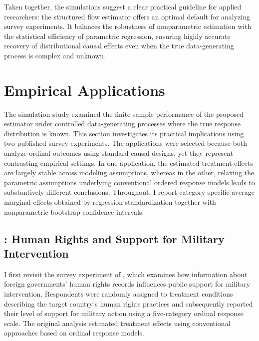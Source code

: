 \documentclass{article}
\begin{document}

Taken together, the simulations suggest a clear practical guideline for applied researchers: the structured flow estimator offers an optimal default for analyzing survey experiments. It balances the robustness of nonparametric estimation with the statistical efficiency of parametric regression, ensuring highly accurate recovery of distributional causal effects even when the true data-generating process is complex and unknown.

\section{Empirical Applications}
\label{sec:application}

The simulation study examined the finite-sample performance of the proposed estimator under controlled data-generating processes where the true response distribution is known. This section investigates its practical implications using two published survey experiments. The applications were selected because both analyze ordinal outcomes using standard causal designs, yet they represent contrasting empirical settings. In one application, the estimated treatment effects are largely stable across modeling assumptions, whereas in the other, relaxing the parametric assumptions underlying conventional ordered response models leads to substantively different conclusions. Throughout, I report category-specific average marginal effects obtained by regression standardization together with nonparametric bootstrap confidence intervals.

\subsection{\citet{Tomz2020a}: Human Rights and Support for Military Intervention}
\label{subsec:tomz}

I first revisit the survey experiment of \citet{Tomz2020a}, which examines how information about foreign governments’ human rights records influences public support for military intervention. Respondents were randomly assigned to treatment conditions describing the target country’s human rights practices and subsequently reported their level of support for military action using a five-category ordinal response scale. The original analysis estimated treatment effects using conventional approaches based on ordinal response models.
\end{document}
